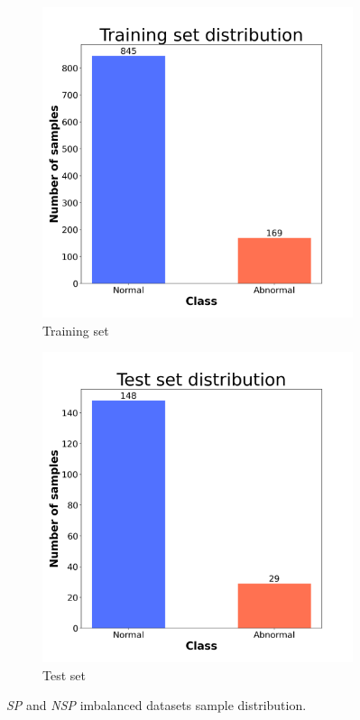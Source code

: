 \begin{figure}[H]
  \centering
  \begin{subfigure}[t]{0.45\textwidth}
      \centering
      \includegraphics[width=1\textwidth]{images/exper2/SP/train_dist.png}
      \caption{Training set}
  \end{subfigure}
  \begin{subfigure}[t]{0.45\textwidth}
      \centering
      \includegraphics[width=1\textwidth]{images/exper2/SP/test_dist.png}
      \caption{Test set}
  \end{subfigure}
  \caption{\textit{SP} and \textit{NSP} imbalanced datasets sample distribution.}
\end{figure}

